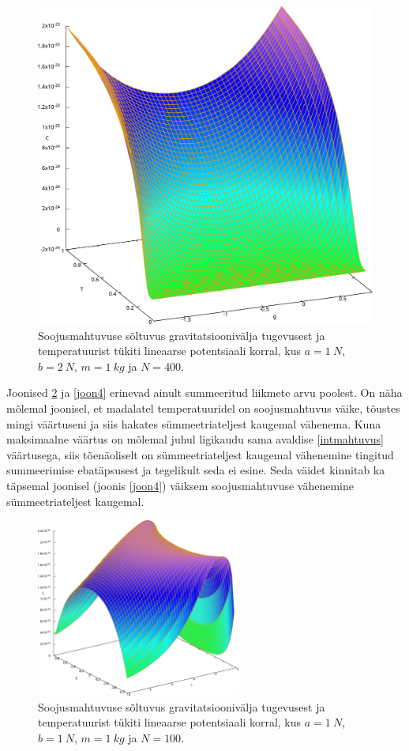 \documentclass{trkut}%
\begin{document}
\begin{figure}[htb!]
    \includegraphics[width=\textwidth]{maxima/m1a1b2T0_1S400.pdf}
    \caption{Soojusmahtuvuse sõltuvus gravitatsioonivälja tugevusest ja temperatuurist tükiti lineaarse potentsiaali korral, kus $a=\SI{1}{N}$, $b=\SI{2}{N}$, $m=\SI{1}{kg}$ ja $N=400$.}
    \label{joon5}
\end{figure}

Joonised \ref{joon3} ja \ref{joon4} erinevad ainult summeeritud liikmete arvu poolest.
On näha mõlemal joonisel, et madalatel temperatuuridel on soojusmahtuvus väike, tõustes mingi väärtuseni ja siis hakates sümmeetriateljest kaugemal vähenema.
Kuna maksimaalne väärtus on mõlemal juhul ligikaudu sama avaldise \eqref{intmahtuvus} väärtusega, siis tõenäoliselt on sümmeetriateljest kaugemal vähenemine tingitud summeerimise ebatäpsusest ja tegelikult seda ei esine.
Seda väidet kinnitab ka täpsemal joonisel (joonis \ref{joon4}) väiksem soojusmahtuvuse vähenemine sümmeetriateljest kaugemal.

\begin{figure}[htb!]
    \includegraphics[width=0.6\textwidth]{maxima/m1a1b1T0_10S100.pdf}
    \caption{Soojusmahtuvuse sõltuvus gravitatsioonivälja tugevusest ja temperatuurist tükiti lineaarse potentsiaali korral, kus $a=\SI{1}{N}$, $b=\SI{1}{N}$, $m=\SI{1}{kg}$ ja $N=100$.}
    \label{joon3}
\end{figure}
\end{document}
